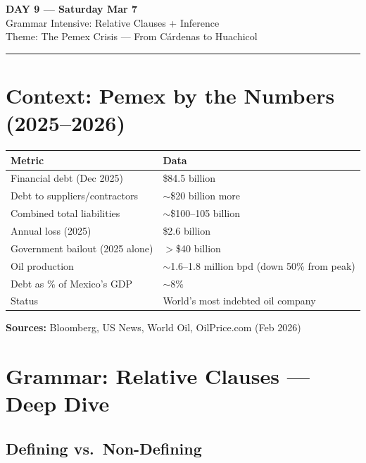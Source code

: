 \documentclass[10pt,a4paper]{article}
\begin{document}
\begin{center}
{\LARGE \textbf{DAY 9 --- Saturday Mar 7}}\\[4pt]
{\large Grammar Intensive: Relative Clauses + Inference}\\[2pt]
{\normalsize Theme: The Pemex Crisis --- From C\'ardenas to Huachicol}\\[2pt]
\rule{\textwidth}{0.8pt}
\end{center}

\section*{Context: Pemex by the Numbers (2025--2026)}

\begin{tcolorbox}[colback=white, colframe=black]
\small
\begin{center}
\begin{tabular}{ll}
\toprule
\textbf{Metric} & \textbf{Data} \\
\midrule
Financial debt (Dec 2025) & \$84.5 billion \\
Debt to suppliers/contractors & $\sim$\$20 billion more \\
Combined total liabilities & $\sim$\$100--105 billion \\
Annual loss (2025) & \$2.6 billion \\
Government bailout (2025 alone) & $>$\$40 billion \\
Oil production & $\sim$1.6--1.8 million bpd (down 50\% from peak) \\
Debt as \% of Mexico's GDP & $\sim$8\% \\
Status & World's most indebted oil company \\
\bottomrule
\end{tabular}
\end{center}
\textbf{Sources:} Bloomberg, US News, World Oil, OilPrice.com (Feb 2026)
\end{tcolorbox}

\section*{Grammar: Relative Clauses --- Deep Dive}

\subsection*{Defining vs.\ Non-Defining}
\end{document}

